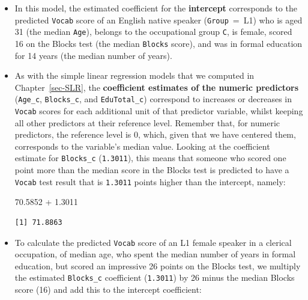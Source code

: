 \documentclass[
  letterpaper,
  DIV=11,
  numbers=noendperiod]{scrreprt}
\newenvironment{Shaded}{\begin{snugshade}}{\end{snugshade}}
\newcommand{\DecValTok}[1]{\textcolor[rgb]{0.68,0.00,0.00}{#1}}
\newcommand{\FloatTok}[1]{\textcolor[rgb]{0.68,0.00,0.00}{#1}}
\newcommand{\FunctionTok}[1]{\textcolor[rgb]{0.28,0.35,0.67}{#1}}
\newcommand{\NormalTok}[1]{\textcolor[rgb]{0.00,0.23,0.31}{#1}}
\newcommand{\SpecialCharTok}[1]{\textcolor[rgb]{0.37,0.37,0.37}{#1}}
\begin{document}
\begin{itemize}
\item
  In this model, the estimated coefficient for the \textbf{intercept}
  corresponds to the predicted \texttt{Vocab} score of an English native
  speaker (\texttt{Group}~=~L1) who is aged 31 (the median
  \texttt{Age}), belongs to the occupational group \texttt{C}, is
  female, scored 16 on the Blocks test (the median \texttt{Blocks}
  score), and was in formal education for 14 years (the median number of
  years).
\item
  As with the simple linear regression models that we computed in
  Chapter~\ref{sec-SLR}, the \textbf{coefficient estimates of the
  numeric predictors} (\texttt{Age\_c}, \texttt{Blocks\_c}, and
  \texttt{EduTotal\_c}) correspond to increases or decreases in
  \texttt{Vocab} scores for each additional unit of that predictor
  variable, whilst keeping all other predictors at their reference
  level. Remember that, for numeric predictors, the reference level is
  0, which, given that we have centered them, corresponds to the
  variable's median value. Looking at the coefficient estimate for
  \texttt{Blocks\_c} (\texttt{1.3011}), this means that someone who
  scored one point more than the median score in the Blocks test is
  predicted to have a \texttt{Vocab} test result that is \texttt{1.3011}
  points higher than the intercept, namely:

\begin{Shaded}
\begin{Highlighting}[]
\FloatTok{70.5852} \SpecialCharTok{+} \FloatTok{1.3011}
\end{Highlighting}
\end{Shaded}

\begin{verbatim}
[1] 71.8863
\end{verbatim}
\item
  To calculate the predicted \texttt{Vocab} score of an L1 female
  speaker in a clerical occupation, of median age, who spent the median
  number of years in formal education, but scored an impressive 26
  points on the Blocks test, we multiply the estimated
  \texttt{Blocks\_c} coefficient (\texttt{1.3011}) by 26 minus the
  median Blocks score (16) and add this to the intercept coefficient:

\begin{Shaded}
\end{Shaded}


\end{itemize}
\end{document}
